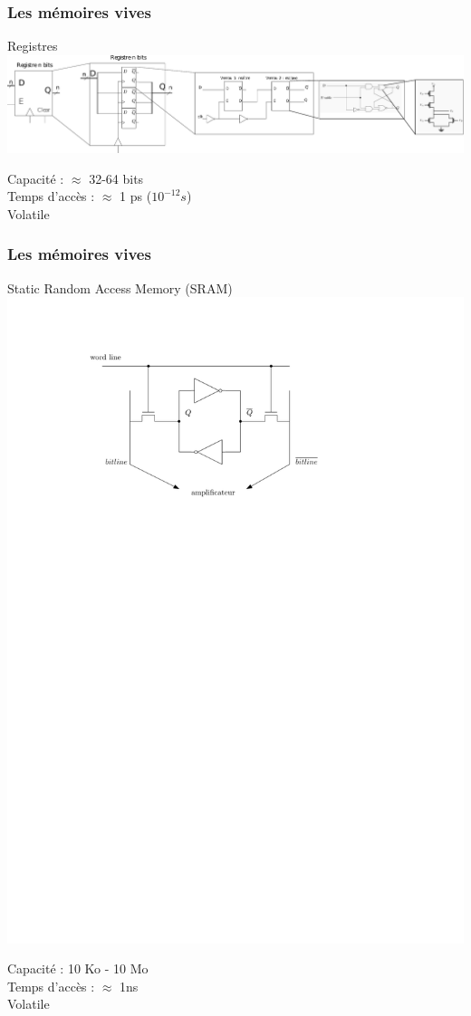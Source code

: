 \documentclass{beamer}
\begin{document}





\begin{frame}
\frametitle{Les mémoires vives}
\begin{block}{Registres}
\center\includegraphics[width=\linewidth]{Figs/memory_register.pdf}
\end{block}

Capacité : $\approx$ 32-64 bits\\
Temps d'accès : $\approx$ 1 ps ($10^{-12}s$)\\
Volatile
\end{frame}

\begin{frame}
\frametitle{Les mémoires vives}
\begin{block}{Static Random Access Memory (SRAM)}
\centering\includegraphics[width=0.5\linewidth]{Figs/sram_inner.pdf}
\end{block}

Capacité : 10 Ko - 10 Mo\\
Temps d'accès : $\approx$ 1ns\\
Volatile
\end{frame}
\end{document}
